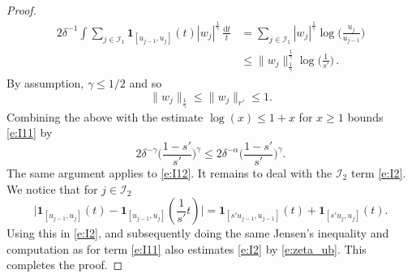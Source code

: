 \documentclass[10pt,a4paper]{amsart}
\begin{document}
\begin{proof}
\begin{align*}
        2\delta^{-1} \int \sum_{j \in \mathcal{I}_1} \mathbf{1}_{[u_{j-1}, u_j]}(t) |w_j|^{\frac{1}{\gamma}} \, \frac{\mathrm{d}t}{t} &= \sum_{j \in \mathcal{I}_1} |w_j|^{\frac{1}{\gamma}} \log\Big( \frac{u_j}{u_{j-1}} \Big)\\
        &\le \|w_j\|_{\frac{1}{\gamma}}^{\frac{1}{\gamma}} \log\Big(\frac{1}{s'} \Big)\,.
    \end{align*}
    By assumption, $\gamma \le 1/2$ and so 
    \[
        \|w_j\|_{\frac{1}{\gamma}} \le \|w_j\|_{r'} \le 1.
    \]
    Combining the above with the estimate $\log(x) \le 1 + x$ for $x \ge 1$ bounds \eqref{e:I11} by 
    \begin{equation}
        \label{e:zeta_ub}
        2 \delta^{-\gamma} \Big(\frac{1 - s'}{s'}\Big)^\gamma \le 2 \delta^{-\alpha} \Big(\frac{1 - s'}{s'}\Big)^\gamma.
    \end{equation}
    The same argument applies to \eqref{e:I12}.
    It remains to deal with the $\mathcal{I}_2$ term \eqref{e:I2}. We  notice that for $j \in \mathcal{I}_2$ 
    \begin{equation}
        \label{e:tel}
        \big|\mathbf{1}_{[u_{j-1}, u_j]}(t) - \mathbf{1}_{[u_{j-1}, u_j]}(\frac{1}{s'}t)\big| = \mathbf{1}_{[s'u_{j-1}, u_{j-1}]}(t) + \mathbf{1}_{[s'u_j, u_j]}(t).
    \end{equation}
    Using this in \eqref{e:I2}, and subsequently doing the same Jensen's inequality and computation as for term \eqref{e:I11} also estimates \eqref{e:I2} by \eqref{e:zeta_ub}. This completes the proof. 
    \end{proof}
\end{document}

